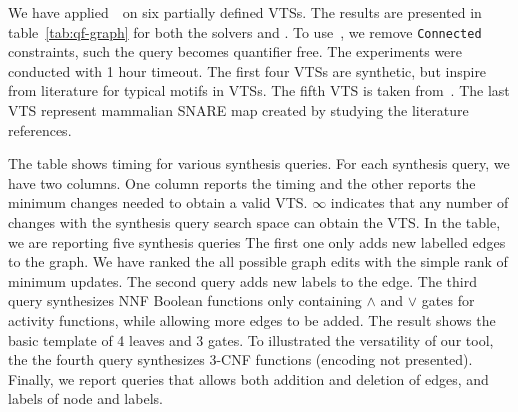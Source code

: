 We have applied~\ourtool~on six partially defined VTSs.
%
The results are presented in table~\ref{tab:qf-graph} for both the solvers
\depqbf and \zthree.
%
To use~\zthree, we remove \texttt{Connected} constraints, such the query becomes
quantifier free.
%
%
The experiments were conducted with 1 hour timeout.
%
The first four VTSs are synthetic, but inspire from literature for
typical motifs in VTSs. 
%
%
The fifth VTS is taken from~\cite{burri2004complete}.
%
The last VTS represent mammalian SNARE map created by studying the literature references.  

The table shows timing for various synthesis queries.
%
For each synthesis query, we have two columns.
%
One column reports the timing and the other reports the minimum changes
needed to obtain a valid VTS.
%
$\infty$ indicates that any number of changes with the synthesis query
search space can obtain the VTS.
%
In the table, we are reporting five synthesis queries
%
The first one only adds new labelled edges to the graph.
%
We have ranked the all possible graph edits with the simple rank of
minimum updates.
%
The second query adds new labels to the edge.
%
The third query synthesizes NNF Boolean functions only containing
$\land$ and $\lor$ gates for activity functions, while allowing
more edges to be added.
%
The result shows the basic template of 4 leaves and 3 gates.
%
%
To illustrated the versatility of our tool, the the fourth query
synthesizes $3$-CNF functions (encoding not presented).
%
Finally, we report queries that allows both addition and deletion of edges, and labels
of node and labels. 


%
%

